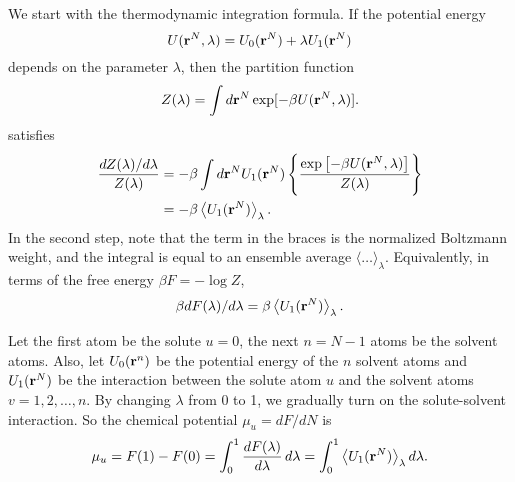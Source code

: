 \documentclass[12pt]{article}
\begin{document}
We start with the thermodynamic integration formula.
If the potential energy
\begin{equation}
  U(\mathbf{r}^N, \lambda) = U_0(\mathbf{r}^N) + \lambda U_1(\mathbf{r}^N)
  \label{eq:potene}
\end{equation}
depends on the parameter $\lambda$,
then the partition function
%
\begin{equation}
  Z(\lambda) = \int d\mathbf{r}^N \exp[-\beta U(\mathbf{r}^N, \lambda)].
  \label{eq:partfunc}
\end{equation}
%
satisfies
\begin{align}
  \frac{ d Z(\lambda) / d\lambda }{Z(\lambda)}
  &=
    -\beta \int d\mathbf{r}^N U_1(\mathbf{r}^N)
    \left\{
      \frac{ \exp
             \left[
             -\beta U(\mathbf{r}^N, \lambda)
             \right]}
      { Z(\lambda) }
    \right\} \notag \\
  &=
    -\beta
    \left\langle
      U_1(\mathbf{r}^N)
    \right\rangle_\lambda.
\end{align}
In the second step, note that the term in the braces
  is the normalized Boltzmann weight,
  and the integral is equal to an ensemble average
  $\langle \dots \rangle_\lambda$.
%
Equivalently, in terms of the free energy $\beta F = -\log Z$,
\begin{equation}
  \beta d F(\lambda) / d\lambda
  = \beta
    \left\langle
      U_1(\mathbf{r}^N)
    \right\rangle_\lambda.
\end{equation}

Let the first atom be the solute $u = 0$,
  the next $n = N - 1$ atoms be the solvent atoms.
Also,
  let $U_0(\mathbf{r}^n)$ be the potential energy of the $n$ solvent atoms
  and $U_1(\mathbf{r}^N)$ be the interaction between the solute atom $u$
  and the solvent atoms $v = 1, 2, \dots, n$.
By changing $\lambda$ from 0 to 1, we gradually turn on
  the solute-solvent interaction.
%
So the chemical potential $\mu_u = dF/dN$ is
\begin{align}
  \mu_u
  =
  F(1) - F(0)
  =
  \int_0^1 \frac{d F(\lambda)}{d \lambda} \, d\lambda
  =
  \int_0^1
    \left\langle
      U_1(\mathbf{r}^N)
    \right\rangle_\lambda d\lambda.
  \label{eq:mu_ti0}
\end{align}
\end{document}
